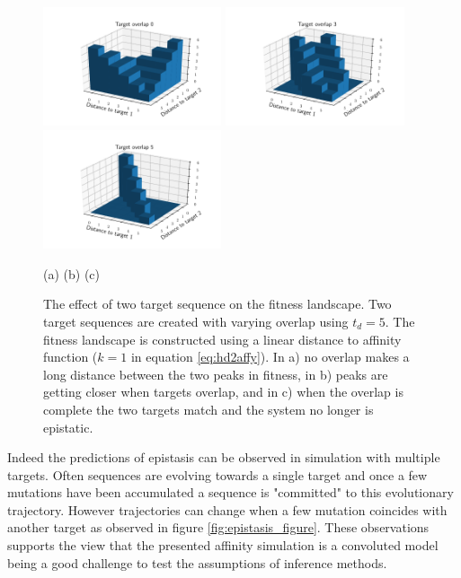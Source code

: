 \begin{figure}[!ht]
\begin{center}
\includegraphics[height=35mm]{figures/fitness_overlap0.pdf}
\includegraphics[height=35mm]{figures/fitness_overlap3.pdf}
\includegraphics[height=35mm]{figures/fitness_overlap5.pdf} \newline%
\end{center}
\vspace{-6mm} \hspace{26mm} (a) \hspace{39mm} (b) \hspace{39mm} (c)
    \caption{
    \label{fig:epistasis}
        The effect of two target sequence on the fitness landscape.
        Two target sequences are created with varying overlap using $t_d=5$.
        The fitness landscape is constructed using a linear distance to affinity function ($k=1$ in equation \ref{eq:hd2affy}).
        In a) no overlap makes a long distance between the two peaks in fitness, in b) peaks are getting closer when targets overlap, and in c) when the overlap is complete the two targets match and the system no longer is epistatic.
        }
\end{figure}


Indeed the predictions of epistasis can be observed in simulation with multiple targets.
Often sequences are evolving towards a single target and once a few mutations have been accumulated a sequence is "committed" to this evolutionary trajectory.
However trajectories can change when a few mutation coincides with another target as observed in figure \ref{fig:epistasis_figure}.
These observations supports the view that the presented affinity simulation is a convoluted model being a good challenge to test the assumptions of inference methods.

